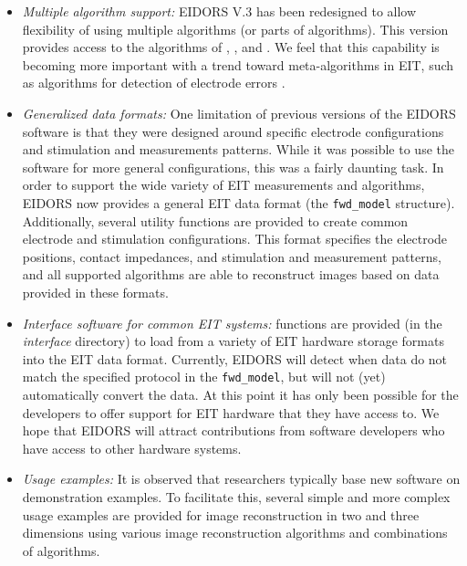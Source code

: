 \documentclass[12pt]{iopart}
\begin{document}
\begin{itemize}

  \item {\em Multiple algorithm support:}
EIDORS V.3 has been redesigned to allow flexibility of
using multiple algorithms (or parts of algorithms). 
This version provides access to the algorithms of
\cite{Adler_and_Guardo_1996}, \cite{Polydorides_and_Lionheart_2002},
\cite{Soleimani_etal_2005} and \cite{Vauhkonen_etal_2000}.
We feel that this capability is becoming more
important with a trend toward meta-algorithms
in EIT, such as algorithms for detection of
electrode errors \cite{Asfaw_and_Adler_2005}. 

  \item {\em Generalized data formats:}
One limitation of previous versions of the EIDORS software
is that they were designed around specific electrode configurations
and stimulation and measurements patterns. While it was possible
to use the software for more general configurations, this was 
a fairly daunting task. In order to support the wide
variety of EIT measurements and algorithms, EIDORS now provides
a general EIT data format (the {\tt fwd\_model} structure).
Additionally, several utility functions are provided to
create common electrode and stimulation configurations.
This format specifies the electrode positions, contact impedances,
and stimulation and measurement patterns, and all supported
algorithms are able to reconstruct images based on data
provided in these formats.

  \item {\em Interface software for common EIT systems:}
functions are provided (in the {\em interface} directory) to load
from a variety of EIT hardware storage formats into the
EIT data format. Currently, EIDORS will detect when data
do not match the specified protocol in the {\tt fwd\_model},
but will not (yet) automatically convert the data.
At this point it has only been possible for the developers to 
offer support for EIT hardware that they have access
to. We hope that EIDORS will attract contributions from
software developers who have access to other hardware
systems.

  \item {\em Usage examples:}
It is observed that researchers typically base new software on
demonstration examples. To facilitate this, several simple and more
complex usage examples are provided for image reconstruction
in two and three dimensions using various image reconstruction
algorithms and combinations of algorithms.


\end{itemize}
\end{document}
